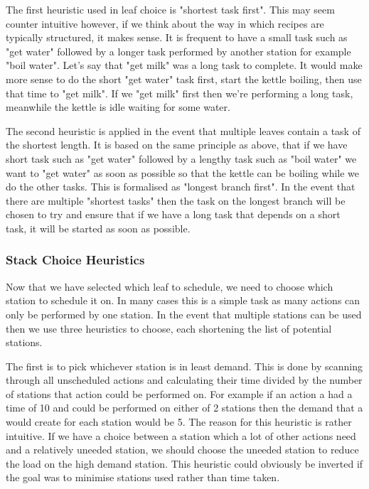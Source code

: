 \documentclass[11pt]{article}
\begin{document}
The first heuristic used in leaf choice is "shortest task first". This may seem counter intuitive however,
if we think about the way in which recipes are typically structured, it makes sense. It is frequent
to have a small task such as "get water" followed by a longer task performed by another station
for example "boil water". Let's say that "get milk" was a long task to complete. It would make more
sense to do the short "get water" task first, start the kettle boiling, then use that time to
"get milk". If we "get milk" first then we're performing a long task, meanwhile the kettle is idle
waiting for some water.

\medbreak

The second heuristic is applied in the event that multiple leaves contain a task of the shortest length.
It is based on the same principle as above, that if we have short task such as "get water" followed
by a lengthy task such as "boil water" we want to "get water" as soon as possible so that the kettle
can be boiling while we do the other tasks. This is formalised as "longest branch first". In the
event that there are multiple "shortest tasks" then the task on the longest branch will be chosen
to try and ensure that if we have a long task that depends on a short task, it will be started
as soon as possible.

\subsubsection{Stack Choice Heuristics}

Now that we have selected which leaf to schedule, we need to choose which station to schedule it on.
In many cases this is a simple task as many actions can only be performed by one station. In the event
that multiple stations can be used then we use three heuristics to choose, each shortening the list of
potential stations.

\medbreak

The first is to pick whichever station is in least demand. This is done by scanning through all unscheduled
actions and calculating their time divided by the number of stations that action could be performed on.
For example if an action a had a time of 10 and could be performed on either of 2 stations then the demand
that a would create for each station would be 5. The reason for this heuristic is rather intuitive. If we
have a choice between a station which a lot of other actions need and a relatively uneeded station, we should
choose the uneeded station to reduce the load on the high demand station. This heuristic could obviously
be inverted if the goal was to minimise stations used rather than time taken.
\end{document}
